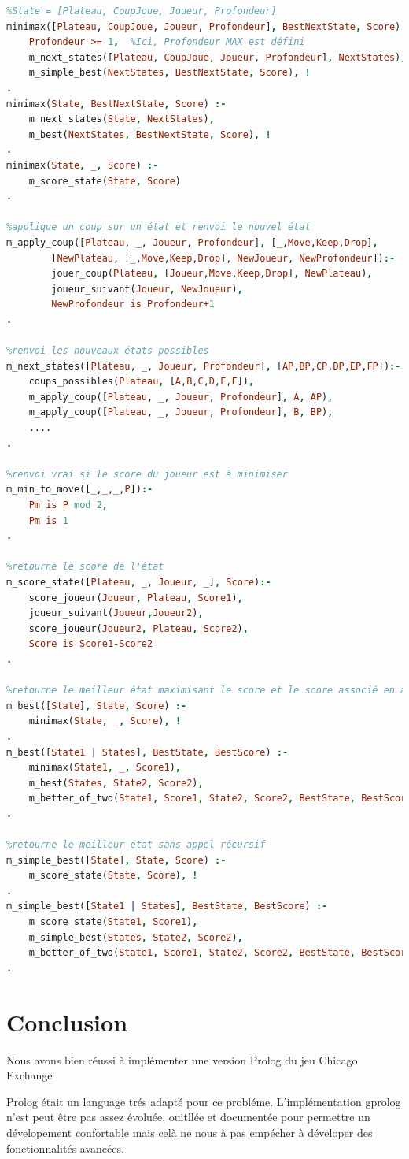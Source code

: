 \documentclass[11pt,a4paper,twoside,french,svgnames]{report}
\begin{document}
\begin{lstlisting}[language=prolog]
%Pour un état donné, retourne le meilleur coup minimax
%State = [Plateau, CoupJoue, Joueur, Profondeur]
minimax([Plateau, CoupJoue, Joueur, Profondeur], BestNextState, Score) :-
    Profondeur >= 1,  %Ici, Profondeur MAX est défini
    m_next_states([Plateau, CoupJoue, Joueur, Profondeur], NextStates),
    m_simple_best(NextStates, BestNextState, Score), !
.
minimax(State, BestNextState, Score) :-
    m_next_states(State, NextStates),
    m_best(NextStates, BestNextState, Score), !
.
minimax(State, _, Score) :-
    m_score_state(State, Score)
.

%applique un coup sur un état et renvoi le nouvel état
m_apply_coup([Plateau, _, Joueur, Profondeur], [_,Move,Keep,Drop],
        [NewPlateau, [_,Move,Keep,Drop], NewJoueur, NewProfondeur]):-
        jouer_coup(Plateau, [Joueur,Move,Keep,Drop], NewPlateau),
        joueur_suivant(Joueur, NewJoueur),
        NewProfondeur is Profondeur+1
.

%renvoi les nouveaux états possibles
m_next_states([Plateau, _, Joueur, Profondeur], [AP,BP,CP,DP,EP,FP]):-
    coups_possibles(Plateau, [A,B,C,D,E,F]),
    m_apply_coup([Plateau, _, Joueur, Profondeur], A, AP),
    m_apply_coup([Plateau, _, Joueur, Profondeur], B, BP),
    ....
.

%renvoi vrai si le score du joueur est à minimiser
m_min_to_move([_,_,_,P]):-
    Pm is P mod 2,
    Pm is 1
.

%retourne le score de l'état
m_score_state([Plateau, _, Joueur, _], Score):-
    score_joueur(Joueur, Plateau, Score1),
    joueur_suivant(Joueur,Joueur2),
    score_joueur(Joueur2, Plateau, Score2),
    Score is Score1-Score2
.

%retourne le meilleur état maximisant le score et le score associé en appelant récursivement minimax
m_best([State], State, Score) :-
    minimax(State, _, Score), !
.
m_best([State1 | States], BestState, BestScore) :-
    minimax(State1, _, Score1),
    m_best(States, State2, Score2),
    m_better_of_two(State1, Score1, State2, Score2, BestState, BestScore)
.

%retourne le meilleur état sans appel récursif
m_simple_best([State], State, Score) :-
    m_score_state(State, Score), !
.
m_simple_best([State1 | States], BestState, BestScore) :-
    m_score_state(State1, Score1),
    m_simple_best(States, State2, Score2),
    m_better_of_two(State1, Score1, State2, Score2, BestState, BestScore)
.
\end{lstlisting}
\chapter{Conclusion}
Nous avons bien réussi à implémenter une version Prolog du jeu Chicago Exchange

Prolog était un language trés adapté pour ce probléme. L'implémentation gprolog n'est peut être pas assez évoluée, ouitllée et documentée pour permettre un dévelopement confortable mais celà ne nous à pas empécher à déveloper des fonctionnalités avancées.
\end{document}
